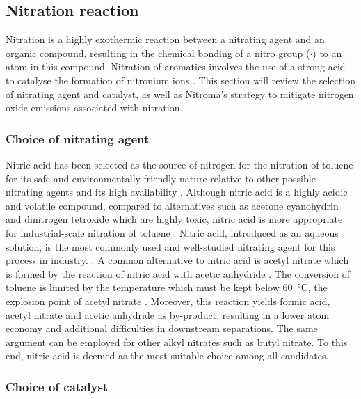 \subsection{Nitration reaction}

Nitration is a highly exothermic reaction between a nitrating agent and an organic compound, resulting in the chemical bonding of a nitro group ($\cdot$) to an atom in this compound. Nitration of aromatics involves the use of a strong acid to catalyse the formation of nitronium ions . This section will review the selection of nitrating agent and catalyst, as well as Nitroma's strategy to mitigate nitrogen oxide emissions associated with nitration.

\subsubsection{Choice of nitrating agent}

Nitric acid has been selected as the source of nitrogen for the nitration of toluene for its safe and environmentally friendly nature relative to other possible nitrating agents and its high availability \cite{miller_kinetics_1964, sreedhar_scientific_2013}. Although nitric acid is a highly acidic and volatile compound, compared to alternatives such as acetone cyanohydrin and dinitrogen tetroxide which are highly toxic, nitric acid is more appropriate for industrial-scale nitration of toluene \cite{dagade_nitration_2002, sreedhar_scientific_2013}. Nitric acid, introduced as an aqueous solution, is the most commonly used and well-studied nitrating agent for this process in industry. \cite{bowers_toluidines_2000}. A common alternative to nitric acid is acetyl nitrate which is formed by the reaction of nitric acid with acetic anhydride \cite{vassena_selective_1999}. The conversion of toluene is limited by the temperature which must be kept below \SI{60}{\celsius}, the explosion point of acetyl nitrate \cite{kuba_batch_2007}. Moreover, this reaction yields formic acid, acetyl nitrate and acetic anhydride as by-product, resulting in a lower atom economy and additional difficulties in downstream separations. The same argument can be employed for other alkyl nitrates such as butyl nitrate. To this end, nitric acid is deemed as the most suitable choice among all candidates.


\subsubsection{Choice of catalyst}


